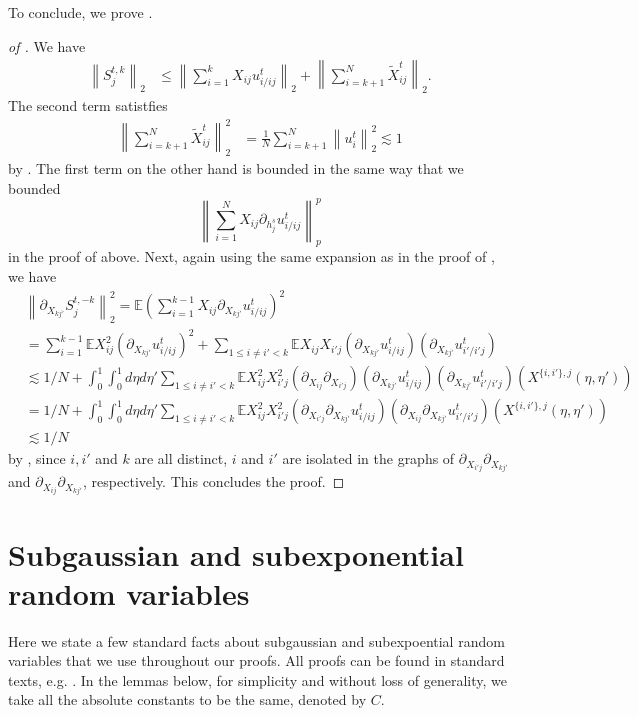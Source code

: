 \documentclass{article}
\newcommand{\1}{\mathbbm{1}}
\newcommand{\norm}[1]{\left\lVert#1\right\rVert}
\theoremstyle{plain}
\theoremstyle{definition}
\theoremstyle{remark}
\newcommand{\E}{\mathbb{E}}
\begin{document}
To conclude, we prove .
\begin{proof}[of ]
We have 
\begin{align*}
    \norm{S_j^{t,k}}_2 &\leq \norm{\sum_{i=1}^{k}X_{ij} u_{i/ij}^{t} }_2 + \norm{\sum_{i=k+1}^N \tilde{X}_{ij}^t}_2.
\end{align*}
The second term satistfies 
\begin{align*}
    \norm{\sum_{i=k+1}^N \tilde{X}_{ij}^t}_2^2 &= \frac{1}{N}\sum_{i=k+1}^N \norm{u_i^{t}}_2^2  \lesssim 1
\end{align*}
by . The first term on the other hand is bounded in the same way that we bounded 
\[
\norm{\sum_{i=1}^N X_{ij} \partial_{h_j^s} u_{i/ij}^{t}}_p^p
\]
in the proof of  above. Next, again using the same expansion as in the proof of , we have
    \begin{align*}
        &\norm{\partial_{X_{kj'}}S^{t,-k}_j}_2^2 = \E\left(\sum_{i=1}^{k-1} X_{ij} \partial_{X_{kj'}}u_{i/ij}^{t}\right)^2 \\
        &= \sum_{i=1}^{k-1}\E X_{ij}^2( \partial_{X_{kj'}}u_{i/ij}^{t})^2 +  \sum_{1\leq i\neq i'<k}\E X_{ij}X_{i'j}( \partial_{X_{kj'}}u_{i/ij}^{t})( \partial_{X_{kj'}}u_{i'/i'j}^{t}) \\
        &\lesssim 1/N + \int_0^1 \int_0^1d\eta d\eta'\sum_{1\leq i\neq i'<k}\E X_{ij}^2X_{i'j}^2(\partial_{X_{ij}}\partial_{X_{i'j}})( \partial_{X_{kj'}}u_{i/ij}^{t})( \partial_{X_{kj'}}u_{i'/i'j}^{t})(X^{\{i,i'\},j}(\eta,\eta')) \\
         &= 1/N + \int_0^1 \int_0^1d\eta d\eta'\sum_{1\leq i\neq i'<k}\E X_{ij}^2X_{i'j}^2( \partial_{X_{i'j}}\partial_{X_{kj'}}u_{i/ij}^{t})( \partial_{X_{ij}}\partial_{X_{kj'}}u_{i'/i'j}^{t})(X^{\{i,i'\},j}(\eta,\eta')) \\
         &\lesssim 1/N
\end{align*}
by , since $i,i'$ and $k$ are all distinct, $i$ and $i'$ are isolated in the graphs of $\partial_{X_{i'j}}\partial_{X_{kj'}}$ and $\partial_{X_{ij}}\partial_{X_{kj'}}$, respectively. This concludes the proof.
\end{proof}



\section{Subgaussian and subexponential random variables}\label{sec:subgaussian-subexponential}
Here we state a few standard facts about subgaussian and subexpoential random variables that we use throughout our proofs. All proofs can be found in standard texts, e.g. \cite{vershynin2018high}. In the lemmas below, for simplicity and without loss of generality, we take all the absolute constants to be the same, denoted by $C.$
\end{document}
